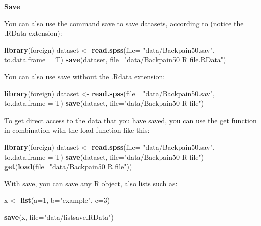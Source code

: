 \documentclass[]{book}
\newenvironment{Shaded}{\begin{snugshade}}{\end{snugshade}}
\newcommand{\KeywordTok}[1]{\textcolor[rgb]{0.13,0.29,0.53}{\textbf{#1}}}
\newcommand{\DataTypeTok}[1]{\textcolor[rgb]{0.13,0.29,0.53}{#1}}
\newcommand{\DecValTok}[1]{\textcolor[rgb]{0.00,0.00,0.81}{#1}}
\newcommand{\StringTok}[1]{\textcolor[rgb]{0.31,0.60,0.02}{#1}}
\newcommand{\NormalTok}[1]{#1}
\begin{document}
\textbf{Save}

You can also use the command save to save datasets, according to (notice
the .RData extension):

\begin{Shaded}
\begin{Highlighting}[]
\KeywordTok{library}\NormalTok{(foreign)}
\NormalTok{dataset <-}\StringTok{ }\KeywordTok{read.spss}\NormalTok{(}\DataTypeTok{file=} \StringTok{"data/Backpain50.sav"}\NormalTok{, }\DataTypeTok{to.data.frame =}\NormalTok{ T)}
\KeywordTok{save}\NormalTok{(dataset, }\DataTypeTok{file=}\StringTok{"data/Backpain50 R file.RData"}\NormalTok{)}
\end{Highlighting}
\end{Shaded}

You can also use save without the .Rdata extension:

\begin{Shaded}
\begin{Highlighting}[]
\KeywordTok{library}\NormalTok{(foreign)}
\NormalTok{dataset <-}\StringTok{ }\KeywordTok{read.spss}\NormalTok{(}\DataTypeTok{file=} \StringTok{"data/Backpain50.sav"}\NormalTok{, }\DataTypeTok{to.data.frame =}\NormalTok{ T)}
\KeywordTok{save}\NormalTok{(dataset, }\DataTypeTok{file=}\StringTok{"data/Backpain50 R file"}\NormalTok{)}
\end{Highlighting}
\end{Shaded}

To get direct access to the data that you have saved, you can use the
get function in combination with the load function like this:

\begin{Shaded}
\begin{Highlighting}[]
\KeywordTok{library}\NormalTok{(foreign)}
\NormalTok{dataset <-}\StringTok{ }\KeywordTok{read.spss}\NormalTok{(}\DataTypeTok{file=} \StringTok{"data/Backpain50.sav"}\NormalTok{, }\DataTypeTok{to.data.frame =}\NormalTok{ T)}
\KeywordTok{save}\NormalTok{(dataset, }\DataTypeTok{file=}\StringTok{"data/Backpain50 R file"}\NormalTok{)}
\KeywordTok{get}\NormalTok{(}\KeywordTok{load}\NormalTok{(}\DataTypeTok{file=}\StringTok{"data/Backpain50 R file"}\NormalTok{))}
\end{Highlighting}
\end{Shaded}

With save, you can save any R object, also lists such as:

\begin{Shaded}
\begin{Highlighting}[]
\NormalTok{x <-}\StringTok{ }\KeywordTok{list}\NormalTok{(}\DataTypeTok{a=}\DecValTok{1}\NormalTok{, }\DataTypeTok{b=}\StringTok{"example"}\NormalTok{, }\DataTypeTok{c=}\DecValTok{3}\NormalTok{)}

\KeywordTok{save}\NormalTok{(x, }\DataTypeTok{file=}\StringTok{"data/listsave.RData"}\NormalTok{)}
\end{Highlighting}
\end{Shaded}
\end{document}
